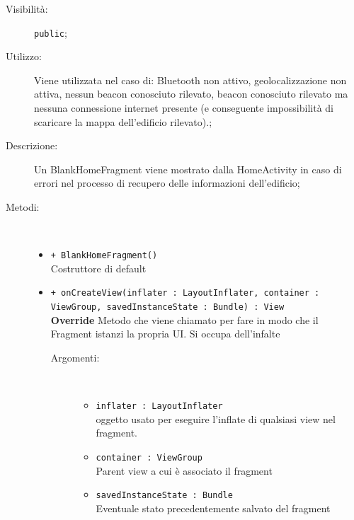 \documentclass[../DefinizioneDiProdotto.tex]{subfiles}
\begin{document}
\begin{description}
\begin{itemize}
	\end{itemize}
	\item[Visibilità:] \texttt{public};
	\item[Utilizzo:] Viene utilizzata nel caso di: Bluetooth non attivo, geolocalizzazione non attiva, nessun beacon conosciuto rilevato, beacon conosciuto rilevato ma nessuna connessione internet presente (e conseguente impossibilità di scaricare la mappa dell'edificio rilevato).;
	\item[Descrizione:] Un BlankHomeFragment viene mostrato dalla HomeActivity in caso di errori nel processo di recupero delle informazioni dell'edificio;
	\item[Metodi:] \
	\begin{itemize}
		\item \texttt{+ BlankHomeFragment()}\\
		Costruttore di default
		\item \texttt{+ onCreateView(inflater : LayoutInflater, container : ViewGroup, savedInstanceState : Bundle) : View}\\
		\textbf{Override} Metodo che viene chiamato per fare in modo che il Fragment istanzi la propria UI. Si occupa dell'infalte
		\begin{description}
			\item[Argomenti:] \
			\begin{itemize}
				\item \texttt{inflater : LayoutInflater}\\
				oggetto usato per eseguire l'inflate di qualsiasi view nel fragment.\item \texttt{container : ViewGroup}\\
				Parent view a cui è associato il fragment\item \texttt{savedInstanceState : Bundle}\\
				Eventuale stato precedentemente salvato del fragment\end{itemize}
		\end{description}
	\end{itemize}
\end{description}
\end{document}
